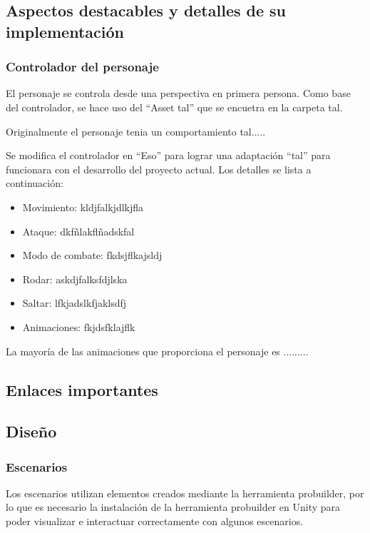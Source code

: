 \subsection{Aspectos destacables y detalles de su implementación}

\subsubsection{Controlador del personaje}
El personaje se controla desde una perspectiva en primera persona. Como base del controlador,  se hace uso del ``Asset tal'' que se encuetra en la carpeta tal.

Originalmente el personaje tenia un comportamiento tal.....

Se modifica el controlador en ``Eso'' para lograr una adaptación ``tal'' para funcionara con el desarrollo del proyecto actual. Los detalles se lista a continuación:

\begin{itemize}
	\item Movimiento: kldjfalkjdlkjfla
	\item Ataque: dkfñlakflñadskfal
	\item Modo de combate: fkdsjflkajsldj
	\item Rodar: askdjfalksfdjlska
	\item Saltar: lfkjadslkfjaklsdfj
	\item Animaciones: fkjdsfklajflk
\end{itemize}

La mayoría de las animaciones que proporciona el personaje es .........


\subsection{Enlaces importantes}




\subsection{Diseño}

\subsubsection{Escenarios}
Los escenarios utilizan elementos creados mediante la herramienta probuilder, por lo que es necesario la instalación de la herramienta probuilder en Unity para poder visualizar e interactuar correctamente con algunos escenarios.

